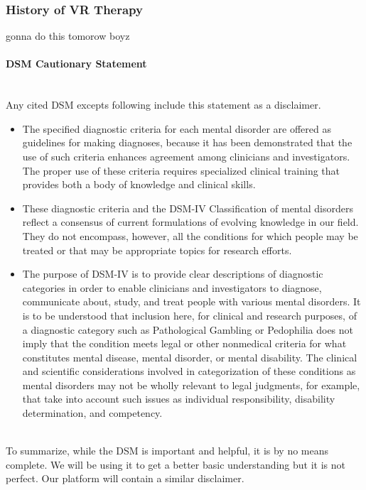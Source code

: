 \documentclass[a4paper,10pt]{article}
\begin{document}
\subsubsection{History of VR Therapy}
gonna do this tomorow boyz
\pagebreak
\paragraph{DSM Cautionary Statement}  ~\\
Any cited DSM excepts following include this statement as a disclaimer. \cite{dsmCaution}
\begin{itemize}

\item The specified diagnostic criteria for each mental disorder are offered as guidelines for making diagnoses, because it has been demonstrated that the use of such criteria enhances agreement among clinicians and investigators. The proper use of these criteria requires specialized clinical training that provides both a body of knowledge and clinical skills. 

\item These diagnostic criteria and the DSM-IV Classification of mental disorders reflect a consensus of current formulations of evolving knowledge in our field. They do not encompass, however, all the conditions for which people may be treated or that may be appropriate topics for research efforts. 

\item The purpose of DSM-IV is to provide clear descriptions of diagnostic categories in order to enable clinicians and investigators to diagnose, communicate about, study, and treat people with various mental disorders. It is to be understood that inclusion here, for clinical and research purposes, of a diagnostic category such as Pathological Gambling or Pedophilia does not imply that the condition meets legal or other nonmedical criteria for what constitutes mental disease, mental disorder, or mental disability. The clinical and scientific considerations involved in categorization of these conditions as mental disorders may not be wholly  relevant to legal judgments, for example, that take into account such issues as individual responsibility, disability determination, and competency.
\end{itemize}
\par~\\
To summarize, while the DSM is important and helpful, it is by no means complete.  We will be using it to get a better basic understanding but it is not perfect.  Our platform will contain a similar disclaimer.
\par
\end{document}

